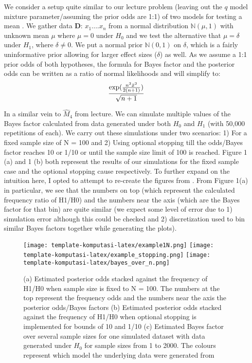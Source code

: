 \documentclass{article}
\begin{document}
We consider a setup quite similar to our lecture problem (leaving out the $q$ model mixture parameter/assuming the prior odds are 1:1) of two models for testing a mean \cite{deng}. We gather data $\textbf{D}$: $x_1....x_n$ from a normal distribution $\mathbb{N}(\mu, 1)$ with unknown mean $\mu$ where $\mu = 0$ under $H_0$ and we test the alternative that $\mu = \delta$ under $H_1$, where $\delta \neq 0$. We put a normal prior $\mathbb{N}(0, 1)$ on $\delta$, which is a fairly uninformative prior allowing for larger effect sizes  ($\delta$) as well. As we assume a 1:1 prior odds of both hypotheses, the formula for Bayes factor and the posterior odds can be written as a ratio of normal likelihoods and will simplify to: 
\begin{equation}
\frac{\textnormal{exp}(\frac{n^2\bar{x}^2}{2(n+1)})}{\sqrt{n+1}}
\end{equation}

In a similar vein to $\hat{M}_4$ from lecture. We can simulate multiple values of the Bayes factor calculated from data generated under both $H_0$ and $H_1$ (with 50,000 repetitions of each). We carry out these simulations under two scenarios: 1) For a fixed sample size of N = 100 and 2) Using optional stopping till the odds/Bayes factor reaches 10 or 1/10 or until the sample size limit of 100 is reached. Figure 1 (a) and 1 (b) both represent the results of our simulations for the fixed sample case and the optional stopping cause respectively. To further expand on the intuition here, I opted to attempt to re-create the figures from \cite{deng, rounder}. 
From Figure 1(a) in particular, we see that the numbers on top (which represent the calculated frequency ratio of H1/H0) and the numbers near the axis (which are the Bayes factor for that bin) are quite similar (we expect some level of error due to 1) simulation error although this could be checked and 2) discretization used to bin similar Bayes factors together while generating the plots). 

\begin{figure}[H]

\centering
\texttt{[image: template-komputasi-latex/example1N.png]}\hfill
\texttt{[image: template-komputasi-latex/example\_stopping.png]}\hfill
\texttt{[image: template-komputasi-latex/bayes\_over\_n.png]}

\caption{(a) Estimated posterior odds stacked against the frequency of H1/H0 when sample size is fixed to N = 100. The numbers at the top represent the frequency odds and the numbers near the axis the posterior odds/Bayes factors (b) Estimated posterior odds stacked against the frequency of H1/H0 when optional stopping is implemented for bounds of 10 and 1/10 (c) Estimated Bayes factor over several sample sizes for one simulated dataset with data generated under $H_0$ for sample sizes from 1 to 2000. The colours represent which model the underlying data were generated from}
\label{fig:figure3}

\end{figure}
\end{document}
